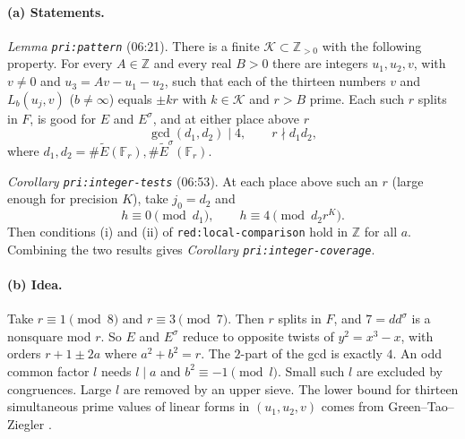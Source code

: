 \documentclass[11pt]{article}
\theoremstyle{definition}
\newcommand{\Z}{\mathbb Z}
\newcommand{\F}{\mathbb F}
\newcommand{\Kmult}{\mathcal K}
\newcommand{\lbl}[1]{\texttt{#1}}
\newcommand{\src}[1]{\textsf{#1}}
\begin{document}
\paragraph{(a) Statements.}
\emph{Lemma \lbl{pri:pattern}} (\src{06:21}).  There is a finite
$\Kmult\subset\Z_{>0}$ with the following property.  For every $A\in\Z$ and
every real $B>0$ there are integers $u_1,u_2,v$, with $v\ne0$ and
$u_3=Av-u_1-u_2$, such that each of the thirteen numbers $v$ and
$L_b(u_j,v)$ ($b\ne\infty$) equals $\pm kr$ with $k\in\Kmult$ and $r>B$
prime.  Each such $r$ splits in $F$, is good for $E$ and $E^\sigma$, and
at either place above $r$
\[
 \gcd(d_1,d_2)\mid4,\qquad r\nmid d_1d_2,
\]
where $d_1,d_2=\#\widetilde E(\F_r),\#\widetilde E^\sigma(\F_r)$.

\emph{Corollary \lbl{pri:integer-tests}} (\src{06:53}).  At each place
above such an $r$ (large enough for precision $K$), take $j_0=d_2$ and
\[
 h\equiv0\pmod{d_1},\qquad h\equiv4\pmod{d_2r^K}.
\]
Then conditions (i) and (ii) of \lbl{red:local-comparison} hold in $\Z$
for all $a$.  Combining the two results gives
\emph{Corollary \lbl{pri:integer-coverage}}.

\paragraph{(b) Idea.}
Take $r\equiv1\pmod8$ and $r\equiv3\pmod7$.  Then $r$ splits in $F$, and
$7=dd^\sigma$ is a nonsquare mod $r$.  So $E$ and $E^\sigma$ reduce to
opposite twists of $y^2=x^3-x$, with orders $r+1\pm2a$ where $a^2+b^2=r$.
The $2$-part of the gcd is exactly $4$.  An odd common factor $l$ needs
$l\mid a$ and $b^2\equiv-1\pmod l$.  Small such $l$ are excluded by
congruences.  Large $l$ are removed by an upper sieve.  The lower bound
for thirteen simultaneous prime values of linear forms in $(u_1,u_2,v)$
comes from Green--Tao--Ziegler \cite{GreenTao2010,GreenTao2012,GreenTaoZiegler2012}.
\end{document}
